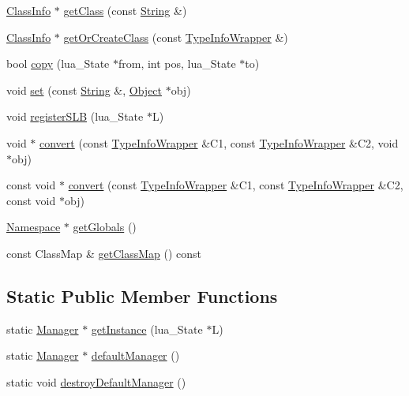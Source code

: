 \begin{DoxyCompactItemize}
\item 
\hyperlink{classSLB_1_1ClassInfo}{Class\+Info} $\ast$ \hyperlink{classSLB_1_1Manager_addbbcefc5578801fd96723e8a065150d}{get\+Class} (const \hyperlink{namespaceSLB_a6a4c36e7004d99c0535c2c91c200c9a1}{String} \&)
\item 
\hyperlink{classSLB_1_1ClassInfo}{Class\+Info} $\ast$ \hyperlink{classSLB_1_1Manager_adb546436a306f64284307b3e78dc0275}{get\+Or\+Create\+Class} (const \hyperlink{classSLB_1_1TypeInfoWrapper}{Type\+Info\+Wrapper} \&)
\item 
bool \hyperlink{classSLB_1_1Manager_a0a200fc2b2402b9f097247d1b412ffe6}{copy} (lua\+\_\+\+State $\ast$from, int pos, lua\+\_\+\+State $\ast$to)
\item 
void \hyperlink{classSLB_1_1Manager_a411bb9c095d8ba74441d23f7f9c54863}{set} (const \hyperlink{namespaceSLB_a6a4c36e7004d99c0535c2c91c200c9a1}{String} \&, \hyperlink{classSLB_1_1Object}{Object} $\ast$obj)
\item 
void \hyperlink{classSLB_1_1Manager_aa647c6678679a4cc8af4aab9715266ef}{register\+S\+LB} (lua\+\_\+\+State $\ast$L)
\item 
void $\ast$ \hyperlink{classSLB_1_1Manager_a124fa5f9d063cc2f336fb98653fb11fd}{convert} (const \hyperlink{classSLB_1_1TypeInfoWrapper}{Type\+Info\+Wrapper} \&C1, const \hyperlink{classSLB_1_1TypeInfoWrapper}{Type\+Info\+Wrapper} \&C2, void $\ast$obj)
\item 
const void $\ast$ \hyperlink{classSLB_1_1Manager_a1fba9d34e69f8c5941114444a1118b31}{convert} (const \hyperlink{classSLB_1_1TypeInfoWrapper}{Type\+Info\+Wrapper} \&C1, const \hyperlink{classSLB_1_1TypeInfoWrapper}{Type\+Info\+Wrapper} \&C2, const void $\ast$obj)
\item 
\hyperlink{classSLB_1_1Namespace}{Namespace} $\ast$ \hyperlink{classSLB_1_1Manager_a097b7c65408c60c5c52af92a83f4410b}{get\+Globals} ()
\item 
const Class\+Map \& \hyperlink{classSLB_1_1Manager_aa5b3c342dc0a998838c56be85f389fa3}{get\+Class\+Map} () const 
\end{DoxyCompactItemize}
\subsection*{Static Public Member Functions}
\begin{DoxyCompactItemize}
\item 
static \hyperlink{classSLB_1_1Manager}{Manager} $\ast$ \hyperlink{classSLB_1_1Manager_a6ad073864d542365b5527ed3dd67f77b}{get\+Instance} (lua\+\_\+\+State $\ast$L)
\item 
static \hyperlink{classSLB_1_1Manager}{Manager} $\ast$ \hyperlink{classSLB_1_1Manager_a174e4612520c3412d10a68e659651677}{default\+Manager} ()
\item 
static void \hyperlink{classSLB_1_1Manager_abf16ecd5df555e082d8628ed388f039f}{destroy\+Default\+Manager} ()
\end{DoxyCompactItemize}
